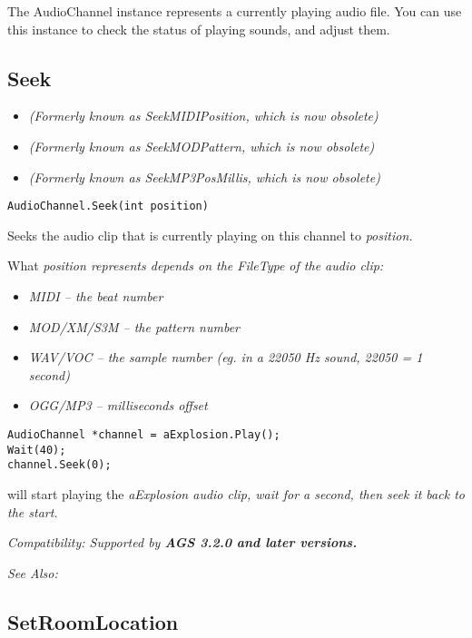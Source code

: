 The AudioChannel instance represents a currently playing audio file. You can use this
instance to check the status of playing sounds, and adjust them.


\subsection{Seek}\label{AudioChannel.Seek}%

\begin{itemize}
\item \it{(Formerly known as SeekMIDIPosition, which is now obsolete)}
\item \it{(Formerly known as SeekMODPattern, which is now obsolete)}
\item \it{(Formerly known as SeekMP3PosMillis, which is now obsolete)}
\end{itemize}

\begin{verbatim}
AudioChannel.Seek(int position)
\end{verbatim}
Seeks the audio clip that is currently playing on this channel to \it{position}.

What \it{position} represents depends on the FileType of the audio clip:
\begin{itemize}
\item \it{MIDI} -- the beat number
\item \it{MOD/XM/S3M} -- the pattern number
\item \it{WAV/VOC} -- the sample number (eg. in a 22050 Hz sound, 22050 = 1 second)
\item \it{OGG/MP3} -- milliseconds offset
\end{itemize}

\begin{verbatim}
AudioChannel *channel = aExplosion.Play();
Wait(40);
channel.Seek(0);
\end{verbatim}
will start playing the \it{aExplosion} audio clip, wait for a second, then seek it back to the start.

\it{Compatibility:} Supported by \bf{AGS 3.2.0} and later versions.

\it{See Also:} 


\subsection{SetRoomLocation}\label{AudioChannel.SetRoomLocation}%

